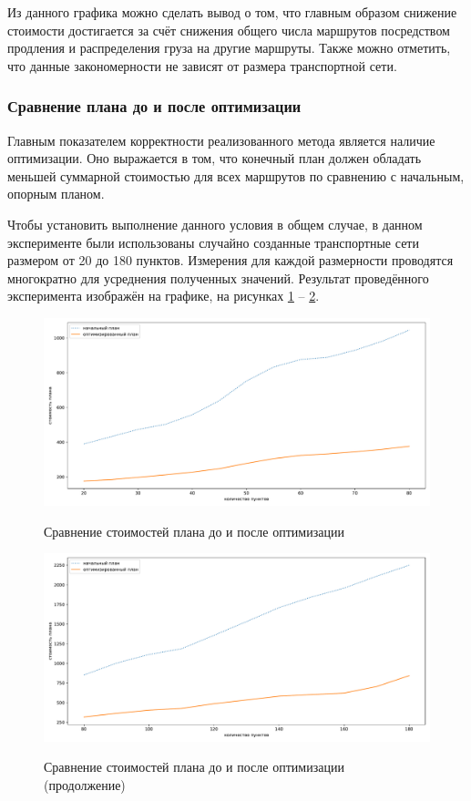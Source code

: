 Из данного графика можно сделать вывод о том, что главным образом снижение стоимости достигается за счёт снижения общего числа маршрутов посредством продления и распределения груза на другие маршруты. Также можно отметить, что данные закономерности не зависят от размера транспортной сети.

\subsubsection{Сравнение плана до и после оптимизации}
Главным показателем корректности реализованного метода является наличие оптимизации. Оно выражается в том, что конечный план должен обладать меньшей суммарной стоимостью для всех маршрутов по сравнению с начальным, опорным планом. 

Чтобы установить выполнение данного условия в общем случае, в данном эксперименте были использованы случайно созданные транспортные сети размером от 20 до 180 пунктов. Измерения для каждой размерности проводятся многократно для усреднения полученных значений. Результат проведённого эксперимента изображён на графике, на рисунках \ref{exp:cmp} -- \ref{exp:cmp2}.

\begin{figure}[h!]
	\begin{center}
		{\includegraphics[scale=0.5, angle=0, page=1]{research/cmp.pdf}}
		\caption{Сравнение стоимостей плана до и после оптимизации}
		\label{exp:cmp}
	\end{center}
\end{figure}

\begin{figure}[h!]
	\begin{center}
		{\includegraphics[scale=0.5, angle=0, page=1]{research/cmp2.pdf}}
		\caption{Сравнение стоимостей плана до и после оптимизации (продолжение)}
		\label{exp:cmp2}
	\end{center}
\end{figure}

